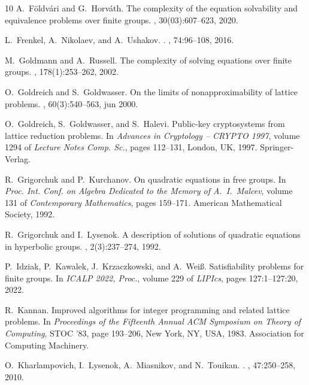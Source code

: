\documentclass{jgcc}
\begin{document}
\begin{thebibliography}{10}
A.~{F{\"o}ldv{\'a}ri} and G.~{Horv{\'a}th}.
\newblock The complexity of the equation solvability and equivalence problems over finite groups.
, 30(03):607--623, 2020.

L.~{Frenkel}, A.~{Nikolaev}, and A.~{Ushakov}.
.
, 74:96--108, 2016.

M.~{Goldmann} and A.~{Russell}.
\newblock The complexity of solving equations over finite groups.
, 178(1):253--262, 2002.

O.~{Goldreich} and S.~{Goldwasser}.
\newblock On the limits of nonapproximability of lattice problems.
, 60(3):540–563, jun 2000.

O.~{Goldreich}, S.~{Goldwasser}, and S.~{Halevi}.
\newblock Public-key cryptosystems from lattice reduction problems.
\newblock In {\em Advances in Cryptology -- CRYPTO 1997}, volume 1294 of {\em Lecture Notes Comp. Sc.}, pages 112--131, London, UK, 1997. Springer-Verlag.

R.~{Grigorchuk} and P.~{Kurchanov}.
\newblock On quadratic equations in free groups.
\newblock In {\em Proc. Int. Conf. on Algebra Dedicated to the Memory of A.~I.~Malcev}, volume 131 of {\em Contemporary Mathematics}, pages 159--171. American Mathematical Society, 1992.

R.~{Grigorchuk} and I.~{Lysenok}.
\newblock A description of solutions of quadratic equations in hyperbolic groups.
, 2(3):237--274, 1992.

P.~{Idziak}, P.~{Kawalek}, J.~{Krzaczkowski}, and A.~{Wei{\ss}}.
\newblock Satisfiability problems for finite groups.
\newblock In {\em {ICALP} 2022, Proc.}, volume 229 of {\em LIPIcs}, pages 127:1--127:20, 2022.

R.~Kannan.
\newblock Improved algorithms for integer programming and related lattice problems.
\newblock In {\em Proceedings of the Fifteenth Annual ACM Symposium on Theory of Computing}, STOC '83, page 193–206, New York, NY, USA, 1983. Association for Computing Machinery.

O.~{Kharlampovich}, I.~Lysenok, A.~Miasnikov, and N.~Touikan.
.
, 47:250--258, 2010.


\end{thebibliography}
\end{document}
